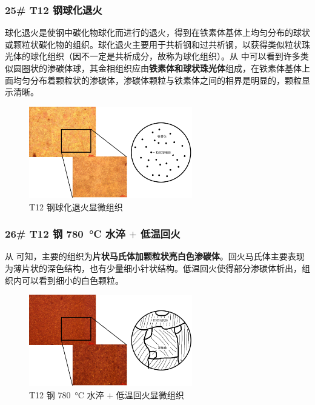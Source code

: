 \documentclass[a4paper,utf8]{article}
\begin{document}
        \subsubsection{25# T12 钢球化退火}
            球化退火是使钢中碳化物球化而进行的退火，得到在铁素体基体上均匀分布的球状或颗粒状碳化物的组织。球化退火主要用于共析钢和过共析钢，以获得类似粒状珠光体的球化组织（因不一定是共析成分，故称为球化组织）。从 中可以看到许多类似圆圈状的渗碳体球，其金相组织应由\textbf{铁素体和球状珠光体}组成，在铁素体基体上面均匀分布着颗粒状的渗碳体，渗碳体颗粒与铁素体之间的相界是明显的，颗粒显示清晰。
            \begin{figure}[!ht]
                \includegraphics[height=40mm]{result/12.pdf}
                \caption{T12 钢球化退火显微组织\label{fig:12}}
            \end{figure}

        \subsubsection{26# T12 钢 \SI{780}{\degreeCelsius} 水淬 $+$ 低温回火\label{ss2:t12_780}}
            从 可知，主要的组织为\textbf{片状马氏体加颗粒状亮白色渗碳体}。回火马氏体主要表现为薄片状的深色结构，也有少量细小针状结构。低温回火使得部分渗碳体析出，组织内可以看到细小的白色颗粒。
            \begin{figure}[!ht]
                \includegraphics[height=40mm]{result/13.pdf}
                \caption{T12 钢 \SI{780}{\degreeCelsius} 水淬 $+$ 低温回火显微组织\label{fig:13}}
            \end{figure}
\end{document}
